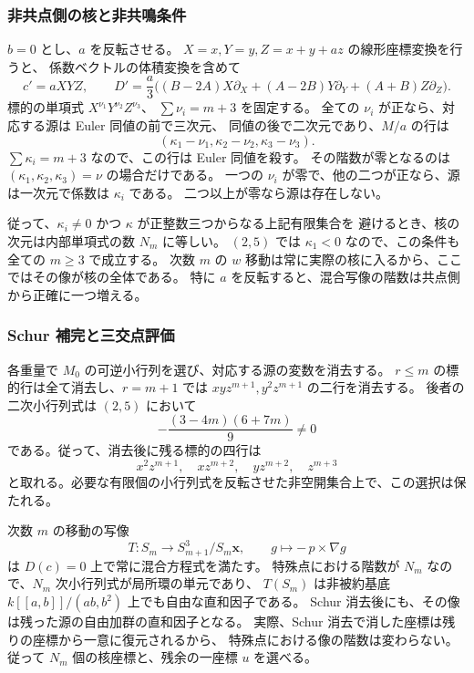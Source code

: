 \subsubsection*{非共点側の核と非共鳴条件}

$b=0$ とし、$a$ を反転させる。
$X=x,Y=y,Z=x+y+az$ の線形座標変換を行うと、
係数ベクトルの体積変換を含めて
\[
 c'=aXYZ,\qquad
 D'=\frac a3\bigl((B-2A)X\partial_X
 +(A-2B)Y\partial_Y+(A+B)Z\partial_Z\bigr).
\]
標的の単項式 $X^{\nu_1}Y^{\nu_2}Z^{\nu_3}$、
$\sum\nu_i=m+3$ を固定する。
全ての $\nu_i$ が正なら、対応する源は Euler 同値の前で三次元、
同値の後で二次元であり、$M/a$ の行は
\[
 (\kappa_1-\nu_1,\kappa_2-\nu_2,\kappa_3-\nu_3).
\]
$\sum\kappa_i=m+3$ なので、この行は Euler 同値を殺す。
その階数が零となるのは $(\kappa_1,\kappa_2,\kappa_3)=\nu$ の場合だけである。
一つの $\nu_i$ が零で、他の二つが正なら、源は一次元で係数は $\kappa_i$ である。
二つ以上が零なら源は存在しない。

従って、$\kappa_i\ne0$ かつ $\kappa$ が正整数三つからなる上記有限集合を
避けるとき、核の次元は内部単項式の数 $N_m$ に等しい。
$(2,5)$ では $\kappa_1<0$ なので、この条件も全ての $m\geq3$ で成立する。
次数 $m$ の $w$ 移動は常に実際の核に入るから、ここではその像が核の全体である。
特に $a$ を反転すると、混合写像の階数は共点側から正確に一つ増える。

\subsubsection*{Schur 補完と三交点評価}

各重量で $M_0$ の可逆小行列を選び、対応する源の変数を消去する。
$r\leq m$ の標的行は全て消去し、$r=m+1$ では
$xy z^{m+1},y^2z^{m+1}$ の二行を消去する。
後者の二次小行列式は $(2,5)$ において
\[
 -\frac{(3-4m)(6+7m)}9\ne0
\]
である。従って、消去後に残る標的の四行は
\[
 x^2z^{m+1},\quad xz^{m+2},\quad yz^{m+2},\quad z^{m+3}
\]
と取れる。必要な有限個の小行列式を反転させた非空開集合上で、この選択は保たれる。

次数 $m$ の移動の写像
\[
 T:S_m\longrightarrow S_{m+1}^3/S_m\mathbf x,
 \qquad g\longmapsto-\,p\times\nabla g
\]
は $D(c)=0$ 上で常に混合方程式を満たす。
特殊点における階数が $N_m$ なので、$N_m$ 次小行列式が局所環の単元であり、
$T(S_m)$ は非被約基底 $k[[a,b]]/(ab,b^2)$ 上でも自由な直和因子である。
Schur 消去後にも、その像は残った源の自由加群の直和因子となる。
実際、Schur 消去で消した座標は残りの座標から一意に復元されるから、
特殊点における像の階数は変わらない。
従って $N_m$ 個の核座標と、残余の一座標 $u$ を選べる。


